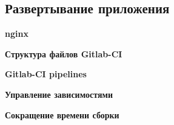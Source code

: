 \subsection*{\large{Развертывание приложения}}


\textbf{nginx}



\textbf{Структура файлов Gitlab-CI}



\textbf{Gitlab-CI pipelines}



\textbf{Управление зависимостями}




\textbf{Сокращение времени сборки}